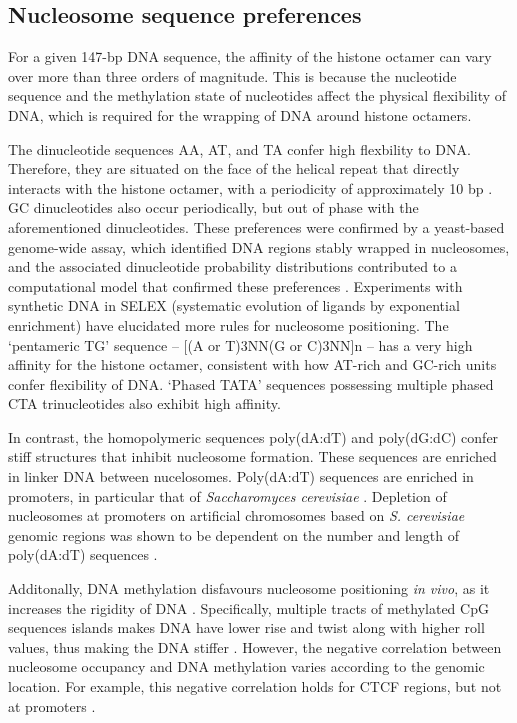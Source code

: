 \documentclass[parskip=full, numbers=noenddot]{scrreprt}
\begin{document}
\subsection{Nucleosome sequence preferences}
\label{ssec:emsaselex_intro_seqpref}

For a given 147-bp DNA sequence, the affinity of the histone octamer can vary over more than three orders of magnitude.  This is because the nucleotide sequence and the methylation state of nucleotides affect the physical flexibility of DNA, which is required for the wrapping of DNA around histone octamers.

The dinucleotide sequences AA, AT, and TA confer high flexbility to DNA.  Therefore, they are situated on the face of the helical repeat that directly interacts with the histone octamer, with a periodicity of approximately 10 bp \citep{struhl_determinants_2013}.  GC dinucleotides also occur periodically, but out of phase with the aforementioned dinucleotides.  These preferences were confirmed by a yeast-based genome-wide assay, which identified DNA regions stably wrapped in nucleosomes, and the associated dinucleotide probability distributions contributed to a computational model that confirmed these preferences \citep{segal_genomic_2006}.  Experiments with synthetic DNA in SELEX (systematic evolution of ligands by exponential enrichment) \citep{lowary_new_1998} have elucidated more rules for nucleosome positioning.  The `pentameric TG' sequence -- [(A or T)3NN(G or C)3NN]n -- has a very high affinity for the histone octamer, consistent with how AT-rich and GC-rich units confer flexibility of DNA.  `Phased TATA' sequences possessing multiple phased CTA trinucleotides also exhibit high affinity.

In contrast, the homopolymeric sequences poly(dA:dT) and poly(dG:dC) confer stiff structures that inhibit nucleosome formation.  These sequences are enriched in linker DNA between nucelosomes.  Poly(dA:dT) sequences are enriched in promoters, in particular that of \emph{Saccharomyces cerevisiae} \citep{struhl_determinants_2013}.  Depletion of nucleosomes at promoters on artificial chromosomes based on \emph{S. cerevisiae} genomic regions was shown to be dependent on the number and length of poly(dA:dT) sequences \citep{hughes_functional_2012}.

Additonally, DNA methylation disfavours nucleosome positioning \emph{in vivo}, as it increases the rigidity of DNA \citep{huff_dnmt1-independent_2014}.  Specifically, multiple tracts of methylated CpG sequences islands makes DNA have lower rise and twist along with higher roll values, thus making the DNA stiffer \citep{rao_systematic_2018, perez_impact_2012}.  However, the negative correlation between nucleosome occupancy and DNA methylation varies according to the genomic location.  For example, this negative correlation holds for CTCF regions, but not at promoters \citep{kelly_genome-wide_2012}.
\end{document}
